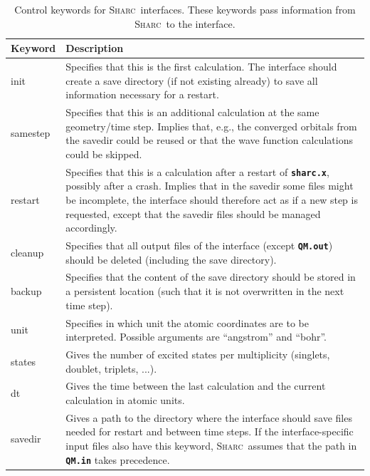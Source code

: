 \documentclass[a4paper,10pt,DIV=15,openany,twoside=false]{scrbook}
\newcommand{\sharc}{\textsc{Sharc}}
\newcommand{\ttt}[1]{\textbf{\texttt{#1}}}
\begin{document}
\begin{table}
  \centering
  \caption{Control keywords for \sharc\ interfaces. These keywords pass information from \sharc\ to the interface.}
  \label{tab:int_ctrl}
  \begin{tabular}{>{\ttfamily}lp{13cm}}
  \toprule
  Keyword       &Description\\
  \midrule
  init            &Specifies that this is the first calculation. The interface should create a save directory (if not existing already) to save all information necessary for a restart. \\
  samestep        &Specifies that this is an additional calculation at the same geometry/time step. Implies that, e.g., the converged orbitals from the savedir could be reused or that the wave function calculations could be skipped.\\
  restart         &Specifies that this is a calculation after a restart of \ttt{sharc.x}, possibly after a crash. Implies that in the savedir some files might be incomplete, the interface should therefore act as if a new step is requested, except that the savedir files should be managed accordingly.\\
  cleanup         &Specifies that all output files of the interface (except \ttt{QM.out}) should be deleted (including the save directory).\\
  backup          &Specifies that the content of the save directory should be stored in a persistent location (such that it is not overwritten in the next time step).\\
  unit            &Specifies in which unit the atomic coordinates are to be interpreted. Possible arguments are ``angstrom'' and ``bohr''.\\
  states          &Gives the number of excited states per multiplicity (singlets, doublet, triplets, ...).\\
  dt              &Gives the time between the last calculation and the current calculation in atomic units.\\
  savedir         &Gives a path to the directory where the interface should save files needed for restart and between time steps. If the interface-specific input files also have this keyword, \sharc\ assumes that the path in \ttt{QM.in} takes precedence.\\
  \bottomrule
  \end{tabular}
\end{table}
\end{document}
